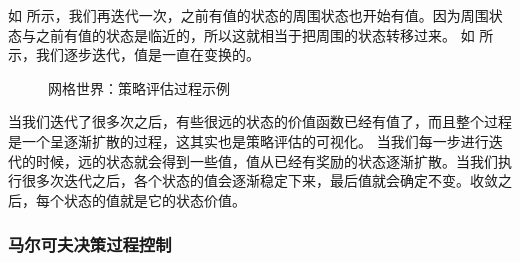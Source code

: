 如 所示，我们再迭代一次，之前有值的状态的周围状态也开始有值。因为周围状态与之前有值的状态是临近的，所以这就相当于把周围的状态转移过来。
如 所示，我们逐步迭代，值是一直在变换的。


 \begin{figure}[h]
  \centering
  \caption{网格世界：策略评估过程示例}
  \label{fig:}
\end{figure}

当我们迭代了很多次之后，有些很远的状态的价值函数已经有值了，而且整个过程是一个呈逐渐扩散的过程，这其实也是策略评估的可视化。
当我们每一步进行迭代的时候，远的状态就会得到一些值，值从已经有奖励的状态逐渐扩散。当我们执行很多次迭代之后，各个状态的值会逐渐稳定下来，最后值就会确定不变。收敛之后，每个状态的值就是它的状态价值。

\subsubsection{马尔可夫决策过程控制} 

